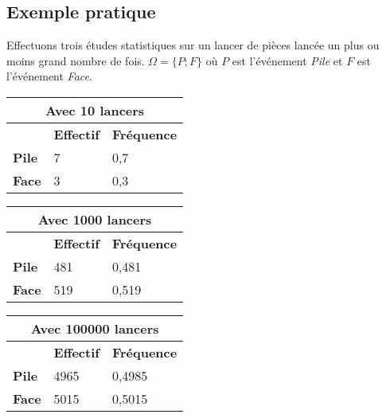 \documentclass[a4paper,12pt]{scrartcl}
\begin{document}
\subsection{Exemple pratique}

Effectuons trois études statistiques sur un lancer de pièces lancée un plus ou moins grand nombre de fois. $\Omega = \{P;F\}$ où $P$ est l'événement \emph{Pile} et $F$ est l'événement \emph{Face}.

\begin{multicols}{2}
\begin{tabular}{|l|l|l|}
\hline
\multicolumn{3}{|c|}{\textbf{Avec 10 lancers}}                  \\ \hline
              & \textbf{Effectif} & \textbf{Fréquence} \\ \hline
\textbf{Pile} & 7                 & 0,7                \\ \hline
\textbf{Face} & 3                 & 0,3                \\ \hline
\end{tabular}

\vspace{2mm}

\begin{tabular}{|l|l|l|}
\hline
\multicolumn{3}{|c|}{\textbf{Avec 1000 lancers}}                  \\ \hline
              & \textbf{Effectif} & \textbf{Fréquence} \\ \hline
\textbf{Pile} & 481               & 0,481              \\ \hline
\textbf{Face} & 519               & 0,519              \\ \hline
\end{tabular}

\vspace{2mm}

\begin{tabular}{|l|l|l|}
\hline
\multicolumn{3}{|c|}{\textbf{Avec 100000 lancers}}                  \\ \hline
              & \textbf{Effectif} & \textbf{Fréquence} \\ \hline
\textbf{Pile} & 4965               & 0,4985              \\ \hline
\textbf{Face} & 5015               & 0,5015              \\ \hline
\end{tabular}

\end{multicols}
\end{document}
